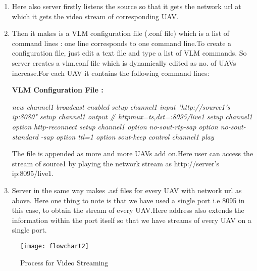 \documentclass[12pt]{article}
\begin{document}
\begin{enumerate}
\item Here also server firstly listens the source so that it gets the network url at which it gets the video stream of corresponding UAV.
\item Then it makes is a VLM configuration file (.conf file) which is a list of command lines : one line corresponds to one command line.To create a configuration file, just edit a text file and type a list of VLM commands. \newline So server creates a vlm.conf file which is dynamically edited as no. of UAVs increase.For each UAV it contains the following command lines:\newpage

\centerline {\bf VLM Configuration File :} 
 \textit {new channel1 broadcast enabled\newline
 setup channel1 input "http://source1's ip:8080"\newline
 setup channel1 output \# http{mux=ts,dst=:8095/live1} \newline
 setup channel1 option http-reconnect \newline
 setup channel1 option no-sout-rtp-sap option no-sout-standard -sap option ttl=1 option sout-keep \newline\newline
 control channel1 play}\newline\newline

The file is appended as more and more UAVs add on.Here user can access the stream of source1 by playing the network stream as http://server's ip:8095/live1.\newline
\item Server in the same way makes .asf files for every UAV with network url as above.
\newline
Here one thing to note is that we have used a single port i.e 8095 in this case, to obtain the stream of every UAV.Here address also extends the information within the port itself so that we have streams of every UAV on a single port.\newpage
\end{enumerate}
\begin{figure}[ht!]
\centering
\texttt{[image: flowchart2]}
\caption{Process for Video Streaming}
\label{overflow}
\end{figure}
\end{document}
